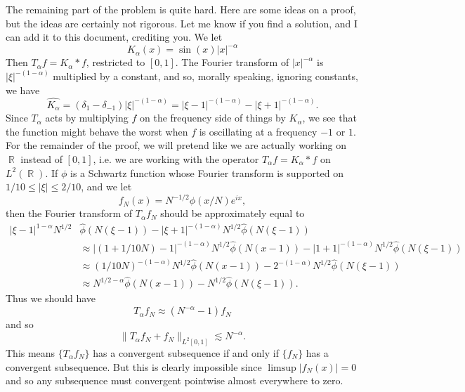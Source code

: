 \documentclass{exam}
\DeclareMathOperator{\RR}{\mathbb{R}}
\theoremstyle{problemstyle}
\newcommand{\1}[1]{\textbf{1}_{\left[#1\right]}} %
\begin{document}
\begin{questions}
\begin{parts}
\begin{solution}
    	The remaining part of the problem is quite hard. Here are some ideas on a proof, but the ideas are certainly not rigorous. Let me know if you find a solution, and I can add it to this document, crediting you. We let
    	\[ K_\alpha(x) = \sin(x) |x|^{-\alpha} \]
    	Then $T_\alpha f = K_\alpha * f$, restricted to $[0,1]$. The Fourier transform of $|x|^{-\alpha}$ is $|\xi|^{-(1 - \alpha)}$ multiplied by a constant, and so, morally speaking, ignoring constants, we have
    	\[ \widehat{K_\alpha} = (\delta_1 - \delta_{-1}) |\xi|^{-(1 - \alpha)} = |\xi - 1|^{-(1 - \alpha)} - |\xi + 1|^{-(1 - \alpha)}. \]
    	Since $T_\alpha$ acts by multiplying $f$ on the frequency side of things by $\widehat{K_\alpha}$, we see that the function might behave the worst when $f$ is oscillating at a frequency $-1$ or $1$. For the remainder of the proof, we will pretend like we are actually working on $\RR$ instead of $[0,1]$, i.e. we are working with the operator $T_\alpha f = K_\alpha * f$ on $L^2(\RR)$. If $\phi$ is a Schwartz function whose Fourier transform is supported on $1/10 \leq |\xi| \leq 2/10$, and we let
    	\[ f_N(x) = N^{-1/2} \phi(x/N) e^{ix}, \]
    	then the Fourier transform of $T_\alpha f_N$ should be approximately equal to
    	\begin{align*}
    		|\xi - 1|^{1 - \alpha} N^{1/2} & \widehat{\phi}(N(\xi - 1)) - |\xi + 1|^{-(1 - \alpha)} N^{1/2} \widehat{\phi}(N(\xi-1))\\
    		&\approx |(1 + 1/10 N) - 1|^{-(1 - \alpha)} N^{1/2} \widehat{\phi}(N(x - 1)) - |1 + 1|^{-(1 - \alpha)} N^{1/2} \widehat{\phi}(N(\xi - 1))\\
    		&\approx (1/10N)^{-(1 - \alpha)} N^{1/2} \widehat{\phi}(N(x - 1)) - 2^{-(1 - \alpha)} N^{1/2} \widehat{\phi}(N(\xi - 1))\\
    		&\approx N^{1/2 - \alpha} \widehat{\phi}(N(x - 1)) - N^{1/2} \widehat{\phi}(N(\xi - 1)).
    	\end{align*}
    	Thus we should have
    	\[ T_\alpha f_N \approx (N^{-\alpha} - 1) f_N \]
    	and so
    	\[ \| T_\alpha f_N + f_N \|_{L^2[0,1]} \lesssim N^{-\alpha}. \]
    	This means $\{ T_\alpha f_N \}$ has a convergent subsequence if and only if $\{ f_N \}$ has a convergent subsequence. But this is clearly impossible since $\limsup |f_N(x)| = 0$ and so any subsequence must convergent pointwise almost everywhere to zero.

    	\begin{comment}


\end{comment}
\end{solution}
\end{parts}
\end{questions}
\end{document}
